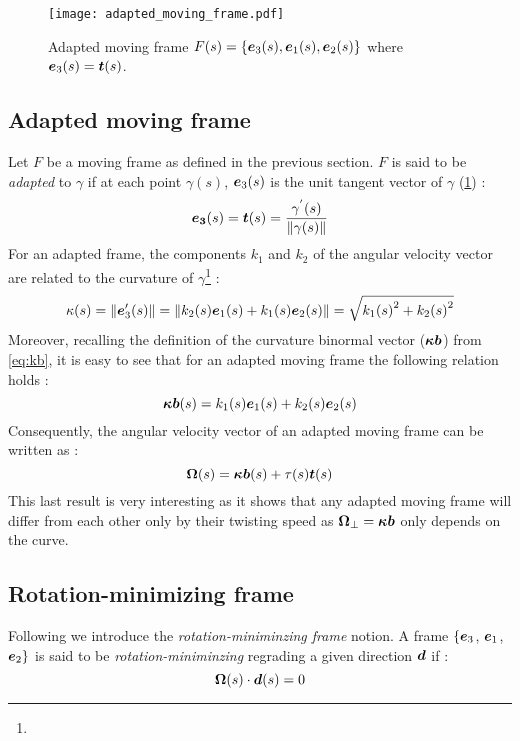 \begin{figure}[t]
\centering
\texttt{[image: adapted\_moving\_frame.pdf]}
\caption{Adapted moving frame $F(s) =\{\boldsymbol{e}_{3}(s),\boldsymbol{e}_{1}(s),\boldsymbol{e}_{2}(s)\}$ where $\boldsymbol{e}_3(s) = \boldsymbol{t}(s)$.}
\label{fig:adapted}
\end{figure}

\subsection{Adapted moving frame}
Let $F$ be a moving frame as defined in the previous section. $F$ is said to be \emph{adapted} to $\gamma$ if at each point $\gamma(s)$, $\boldsymbol{e}_{3}(s)$ is the unit tangent vector of $\gamma$ (\cref{fig:adapted}) :
\begin{equation}
	\boldsymbol{e_{3}}(s) = \boldsymbol{t}(s) = \frac{\gamma^{'}(s)}{\|\gamma(s)\|}
\end{equation}
For an adapted frame, the components $k_1$ and $k_2$ of the angular velocity vector are related to the curvature of $\gamma$\footnote{} : 
\begin{equation}
	\kappa(s) = \|\boldsymbol{e}'_{3}(s)\| = \|k_2(s)\boldsymbol{e}_1(s) + k_1(s)\boldsymbol{e}_2(s)\| = \sqrt{{k_{1}(s)}^2 + {k_{2}(s)}^2}
\end{equation}
Moreover, recalling the definition of the curvature binormal vector ($\boldsymbol{\kappa b}$) from \cref{eq:kb}, it is easy to see that for an adapted moving frame the following relation holds :
 \begin{equation}
	\boldsymbol{\kappa b}(s) = k_1(s) \boldsymbol{e}_1(s) +  k_2(s) \boldsymbol{e}_2(s)
\end{equation}
Consequently, the angular velocity vector of an adapted moving frame can be written as :
 \begin{equation}
	\boldsymbol{\Omega}(s) = \boldsymbol{\kappa b}(s)  + \tau(s) \boldsymbol{t}(s)
\end{equation}
This last result is very interesting as it shows that any adapted moving frame will differ from each other only by their twisting speed as $\boldsymbol{\Omega}_{\perp} =  \boldsymbol{\kappa b}$ only depends on the curve.

\subsection{Rotation-minimizing frame}
Following \cite{Farouki2014, Wang2008} we introduce the \emph{rotation-miniminzing frame} notion. A frame $\{\boldsymbol{e}_{3}$, $\boldsymbol{e}_{1}$, $\boldsymbol{e}_{2}\}$ is said to be \emph{rotation-miniminzing} regrading a given direction $\boldsymbol{d}$ if :
\begin{equation}
	\boldsymbol{\Omega}(s) \cdot \boldsymbol{d}(s) = 0
\end{equation}


